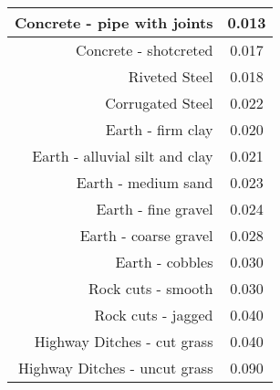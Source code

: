 \documentclass[10pt, oneside]{amsart}
\begin{document}
\begin{center}
\begin{tabular}{rc}
		Concrete - pipe with joints                                        & 0.013                   \\ \midrule
		
		Concrete - shotcreted                                              & 0.017                   \\ \midrule
		
		Riveted Steel                                                      & 0.018                   \\ \midrule
		
		Corrugated Steel                                                   & 0.022                   \\ \midrule
		
		Earth - firm clay                                                  & 0.020                   \\ \midrule
		
		Earth - alluvial silt and clay                                     & 0.021                   \\ \midrule
		
		Earth - medium sand                                                & 0.023                   \\ \midrule
		
		Earth - fine gravel                                                & 0.024                   \\ \midrule
		
		Earth - coarse gravel                                              & 0.028                   \\ \midrule
		
		Earth - cobbles                                                    & 0.030                   \\
		Rock cuts - smooth                                                 & 0.030                   \\ \midrule
		
		Rock cuts - jagged                                                 & 0.040                   \\ \midrule
		
		Highway Ditches - cut grass                                        & 0.040                   \\ \midrule
		
		Highway Ditches - uncut grass                                      & 0.090                   \\ \midrule
		

\end{tabular}
\end{center}
\end{document}
